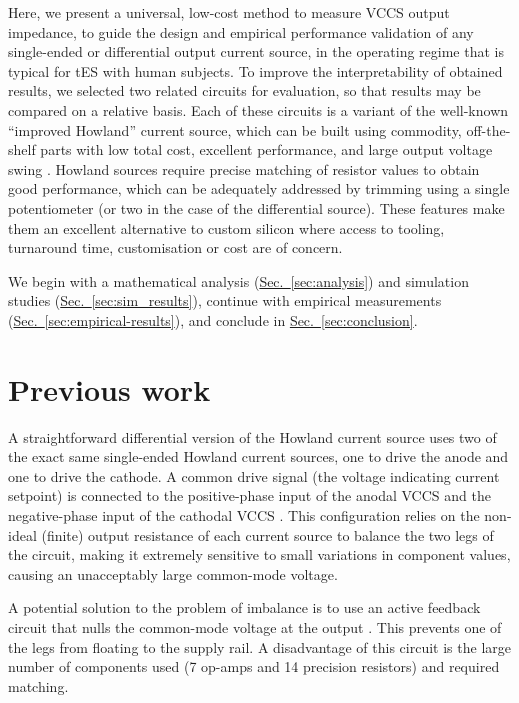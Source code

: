 \documentclass[10pt]{article}
\newcommand{\briefseclink}[1]{\hyperref[#1]{Sec.~\ref*{#1}}}
\begin{document}
Here, we present a universal, low-cost method to measure VCCS output impedance, to guide the design and empirical performance validation of any single-ended or differential output current source, in the operating regime that is typical for tES with human subjects. To improve the interpretability of obtained results, we selected two related circuits for evaluation, so that results may be compared on a relative basis. Each of these circuits is a variant of the well-known ``improved Howland'' current source, which can be built using commodity, off-the-shelf parts with low total cost, excellent performance, and large output voltage swing \cite{Franco1988}. Howland sources require precise matching of resistor values to obtain good performance, which can be adequately addressed by trimming using a single potentiometer (or two in the case of the differential source). These features make them an excellent alternative to custom silicon where access to tooling, turnaround time, customisation or cost are of concern.

We begin with a mathematical analysis (\briefseclink{sec:analysis}) and simulation studies (\briefseclink{sec:sim_results}), continue with empirical measurements (\briefseclink{sec:empirical-results}), and conclude in \briefseclink{sec:conclusion}.

\raggedbottom


\section{Previous work}
\label{sec:previous_work}

A straightforward differential version of the Howland current source uses two of the exact same single-ended Howland current sources, one to drive the anode and one to drive the cathode. A common drive signal (the voltage indicating current setpoint) is connected to the positive-phase input of the anodal VCCS and the negative-phase input of the cathodal VCCS \cite{1742-6596-407-1-012030}\cite{pmid19706961}. This configuration relies on the non-ideal (finite) output resistance of each current source to balance the two legs of the circuit, making it extremely sensitive to small variations in component values, causing an unacceptably large common-mode voltage.

A potential solution to the problem of imbalance is to use an active feedback circuit that nulls the common-mode voltage at the output \cite{US2002060915A1:misc}. This prevents one of the legs from floating to the supply rail. A disadvantage of this circuit is the large number of components used (7 op-amps and 14 precision resistors) and required matching.
\end{document}
